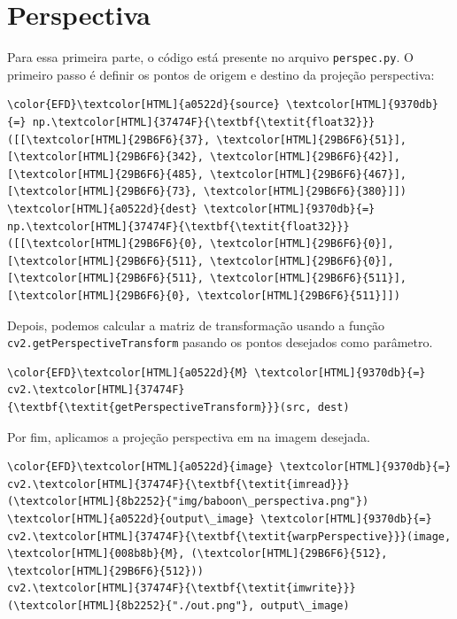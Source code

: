 \documentclass[11pt]{article}
\begin{document}
\section*{Perspectiva}
\label{sec:orgde20c81}
Para essa primeira parte, o código está presente no arquivo \texttt{perspec.py}.
O primeiro passo é definir os pontos de origem e destino da projeção perspectiva:
\begin{Code}
\begin{Verbatim}
\color{EFD}\textcolor[HTML]{a0522d}{source} \textcolor[HTML]{9370db}{=} np.\textcolor[HTML]{37474F}{\textbf{\textit{float32}}}([[\textcolor[HTML]{29B6F6}{37}, \textcolor[HTML]{29B6F6}{51}], [\textcolor[HTML]{29B6F6}{342}, \textcolor[HTML]{29B6F6}{42}], [\textcolor[HTML]{29B6F6}{485}, \textcolor[HTML]{29B6F6}{467}], [\textcolor[HTML]{29B6F6}{73}, \textcolor[HTML]{29B6F6}{380}]])
\textcolor[HTML]{a0522d}{dest} \textcolor[HTML]{9370db}{=} np.\textcolor[HTML]{37474F}{\textbf{\textit{float32}}}([[\textcolor[HTML]{29B6F6}{0}, \textcolor[HTML]{29B6F6}{0}], [\textcolor[HTML]{29B6F6}{511}, \textcolor[HTML]{29B6F6}{0}], [\textcolor[HTML]{29B6F6}{511}, \textcolor[HTML]{29B6F6}{511}], [\textcolor[HTML]{29B6F6}{0}, \textcolor[HTML]{29B6F6}{511}]])
\end{Verbatim}
\end{Code}

Depois, podemos calcular a matriz de transformação usando a função \texttt{cv2.getPerspectiveTransform} pasando os pontos desejados como parâmetro.
\begin{Code}
\begin{Verbatim}
\color{EFD}\textcolor[HTML]{a0522d}{M} \textcolor[HTML]{9370db}{=} cv2.\textcolor[HTML]{37474F}{\textbf{\textit{getPerspectiveTransform}}}(src, dest)
\end{Verbatim}
\end{Code}

Por fim, aplicamos a projeção perspectiva em na imagem desejada.
\begin{Code}
\begin{Verbatim}
\color{EFD}\textcolor[HTML]{a0522d}{image} \textcolor[HTML]{9370db}{=} cv2.\textcolor[HTML]{37474F}{\textbf{\textit{imread}}}(\textcolor[HTML]{8b2252}{"img/baboon\_perspectiva.png"})
\textcolor[HTML]{a0522d}{output\_image} \textcolor[HTML]{9370db}{=} cv2.\textcolor[HTML]{37474F}{\textbf{\textit{warpPerspective}}}(image, \textcolor[HTML]{008b8b}{M}, (\textcolor[HTML]{29B6F6}{512}, \textcolor[HTML]{29B6F6}{512}))
cv2.\textcolor[HTML]{37474F}{\textbf{\textit{imwrite}}}(\textcolor[HTML]{8b2252}{"./out.png"}, output\_image)
\end{Verbatim}
\end{Code}
\end{document}
